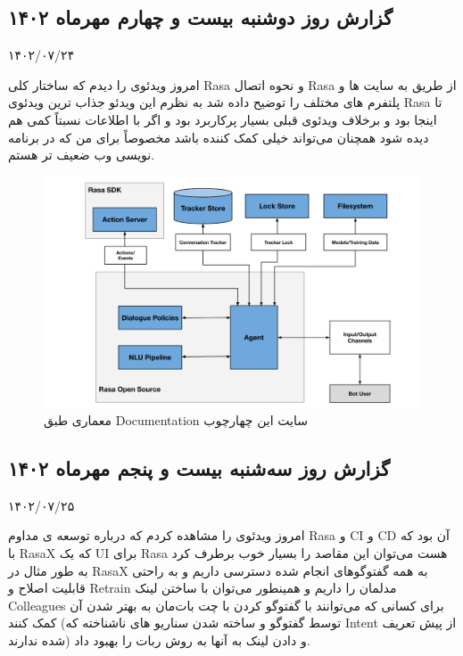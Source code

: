 \subsection{گزارش روز دوشنبه بیست و چهارم مهرماه ۱۴۰۲}

۱۴۰۲/۰۷/۲۴

امروز ویدئوی  را دیدم که ساختار کلی Rasa و نحوه اتصال Rasa از طریق  به سایت ها و پلتفرم های مختلف را توضیح داده شد به نظرم این ویدئو جذاب ترین ویدئوی Rasa تا اینجا بود و برخلاف ویدئوی قبلی بسیار پرکاربرد بود و اگر با اطلاعات نسبتاً کمی هم دیده شود همچنان می‌تواند خیلی کمک کننده باشد مخصوصاً برای من که در برنامه نویسی وب ضعیف تر هستم.

\begin{figure}[h]
    \includegraphics[width=\linewidth]{Images/Rasa_Architecture.png}
    \caption{معماری  طبق Documentation سایت این چهارچوب}
\end{figure}


\subsection{گزارش روز سه‌شنبه بیست و پنجم مهرماه ۱۴۰۲}

۱۴۰۲/۰۷/۲۵

امروز ویدئوی  را مشاهده کردم که درباره توسعه ی مداوم Rasa و CI و CD آن بود که با RasaX که یک UI برای Rasa هست می‌توان این مقاصد را بسیار خوب برطرف کرد به طور مثال در RasaX به همه گفتوگوهای انجام شده دسترسی داریم و به راحتی قابلیت اصلاح و Retrain مدلمان را داریم و همینطور می‌توان با ساختن لینک Colleagues برای کسانی که می‌توانند با گفتوگو کردن با چت بات‌مان به بهتر شدن آن کمک کنند (توسط گفتوگو و ساخته شدن سناریو های ناشناخته که Intent از پیش تعریف شده ندارند) و دادن لینک به آنها به روش  ربات را بهبود داد.


